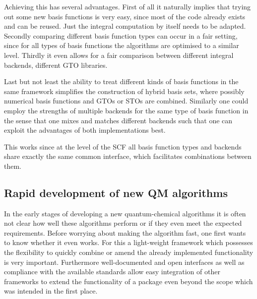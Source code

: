 Achieving this has several advantages.
First of all it naturally implies that trying out some new basis functions is very easy,
since most of the code already exists and can be reused.
Just the integral computation by itself needs to be adapted.
Secondly comparing different basis function types can occur in a fair setting,
since for all types of basis functions the algorithms are optimised to a similar level.
Thirdly it even allows for a fair comparison between different integral backends,
\eg different GTO libraries.

Last but not least the ability to treat different kinds of basis functions
in the same framework simplifies the construction of hybrid basis sets,
where possibly numerical basis functions and GTOs or STOs are combined.
Similarly one could employ the strengths of multiple backends for the same type of basis function
in the sense that one mixes and matches different backends such that one can exploit
the advantages of both implementations best.

This works since at the level of the SCF all basis function types and backends
share exactly the same common interface,
which facilitates combinations between them.


\subsection{Rapid development of new QM algorithms}

In the early stages of developing a new quantum-chemical algorithms
it is often not clear how well these algorithms perform
or if they even meet the expected requirements.
Before worrying about making the algorithm fast,
one first wants to know whether it even works.
For this a light-weight framework which possesses the flexibility
to quickly combine or amend the already implemented
functionality is very important.
Furthermore well-documented and open interfaces
as well as compliance with the available standards
allow easy integration of other frameworks to extend
the functionality of a package even beyond the scope
which was intended in the first place.

